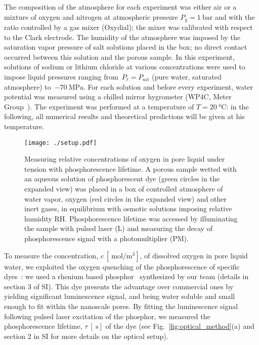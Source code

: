 \documentclass[aps,prl,twocolumn,superscriptaddress,groupedaddress]{revtex4}
\begin{document}
The composition of the atmosphere for each experiment was either air or a mixture of oxygen and nitrogen at atmospheric pressure $P_\text{g}=\SI{1}{\bar}$ and with the ratio controlled by a gas mixer (Oxydial); the mixer was calibrated with respect to the Clark electrode. The humidity of the atmosphere was imposed by the saturation vapor pressure of salt solutions placed in the box; no direct contact occurred between this solution and the porous sample. In this experiment, solutions of sodium or lithium chloride at various concentrations were used to impose liquid pressures ranging from~$P_\ell = P_\text{sat}$ (pure water, saturated atmosphere) to~$\SI{-70}{\mega\pascal}$. For each solution and before every experiment, water potential was measured using a chilled mirror hygrometer (WP4C, Meter Group~\cite{aqualab}). The experiment was performed at a temperature of $T=\SI{20}{\celsius}$: in the following, all numerical results and theoretical predictions will be given at his temperature.


\onecolumngrid
\begin{center}
\begin{figure}[!htb]
\centering
\texttt{[image: ./setup.pdf]}
\caption{Measuring relative concentrations of oxygen in pore liquid under tension with phosphorescence lifetime. A porous sample wetted with an aqueous solution of phosphorescent dye (green circles in the expanded view) was placed in a box of controlled atmosphere of water vapor, oxygen (red circles in the expanded view) and other inert gases, in equilibrium with osmotic solutions imposing relative humidity $\mathrm{RH}$. Phosphorescence lifetime was accessed by illuminating the sample with pulsed laser (L) and measuring the decay of phosphorescence signal with a photomultiplier (PM).\label{fig:setup}}
\end{figure}
\end{center}
\twocolumngrid

To measure the concentration, $c \ [\SI{}{\mole\per\meter\cubed}]$, of dissolved oxygen in pore liquid water, we exploited the oxygen quenching of the phosphorescence of specific dyes~\cite{esipova_2011,choi_2012}: we used a rhenium based phosphor~\cite{marker_2018} synthesized by our team (details in section 3 of SI). This dye presents the advantage over commercial ones by yielding significant luminescence signal, and being water soluble and small enough to fit within the nanoscale pores. By fitting the luminescence signal following pulsed laser excitation of the phosphor, we measured the phosphorescence lifetime, $\tau \ [\SI{}{\second}]$ of the dye (see Fig.~\ref{fig:optical_method}(a) and section 2 in SI for more details on the optical setup). 
\end{document}
